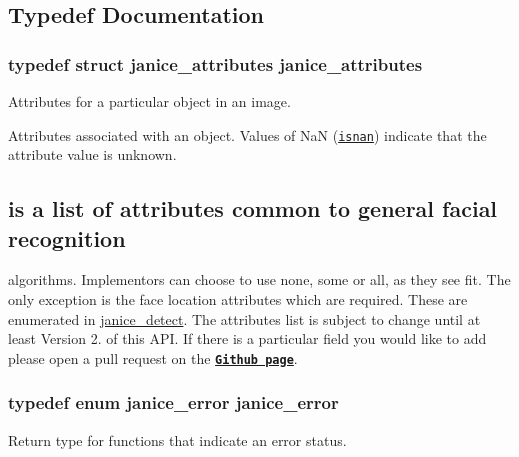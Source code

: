 \subsection{Typedef Documentation}
\hypertarget{group__janice_gaf16b5ce9751b8450f61adb9a957b0fc2}{}
\subsubsection[{janice\+\_\+attributes}]{\setlength{\rightskip}{0pt plus 5cm}typedef struct {\bf janice\+\_\+attributes}  {\bf janice\+\_\+attributes}}\label{group__janice_gaf16b5ce9751b8450f61adb9a957b0fc2}


Attributes for a particular object in an image. 

Attributes associated with an object. Values of {\ttfamily Na\+N} (\href{http://www.cplusplus.com/reference/cmath/isnan/}{\tt isnan}) indicate that the attribute value is unknown.\hypertarget{group__janice_Below}{}\subsection{is a list of attributes common to general facial recognition}\label{group__janice_Below}
algorithms. Implementors can choose to use none, some or all, as they see fit. The only exception is the face location attributes which are required. These are enumerated in \hyperlink{group__janice_ga689c273a241f8e8694468fa561a7184b}{janice\+\_\+detect}. The attributes list is subject to change until at least Version 2. of this A\+P\+I. If there is a particular field you would like to add please open a pull request on the \href{https://github.com/Noblis/janice/pulls}{\tt {\bfseries Github page}}. \hypertarget{group__janice_gac9071fe2c752efef60aa3f932a290fda}{}
\subsubsection[{janice\+\_\+error}]{\setlength{\rightskip}{0pt plus 5cm}typedef enum {\bf janice\+\_\+error}  {\bf janice\+\_\+error}}\label{group__janice_gac9071fe2c752efef60aa3f932a290fda}


Return type for functions that indicate an error status. 

